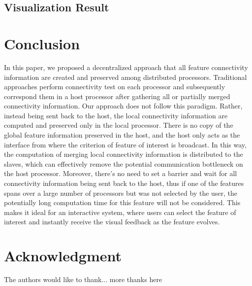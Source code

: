 \documentclass[10pt, conference, compsocconf]{IEEEtran}
\begin{document}
\subsection{Visualization Result}

\section{Conclusion}
In this paper, we proposed a decentralized approach that all feature connectivity information are created and preserved among distributed processors. Traditional approaches perform connectivity test on each processor and subsequently correspond them in a host processor after gathering all or partially merged connectivity information. Our approach does not follow this paradigm. Rather, %
instead being sent back to the host, the local connectivity information are computed and preserved only in the local processor. 
There is no copy of the global feature information preserved in the host, and the host only acts as the interface from where the criterion of feature of interest is broadcast. In this way, the computation of merging local connectivity information is distributed to the slaves, which can effectively remove the potential communication bottleneck on the host processor. 
Moreover, there's no need to set a barrier and wait for all connectivity information being sent back to the host, thus if one of the features spans over a large number of processors but was not selected by the user, the potentially long computation time for this feature will not be considered. This makes it ideal for an interactive system, where users can select the feature of interest and instantly receive the visual feedback as the feature evolves. \marginpar{\textcolor{red}{unreadable. it seems to repeat the previous sentences.}}

\section*{Acknowledgment}
The authors would like to thank...
more thanks here






\end{document}
